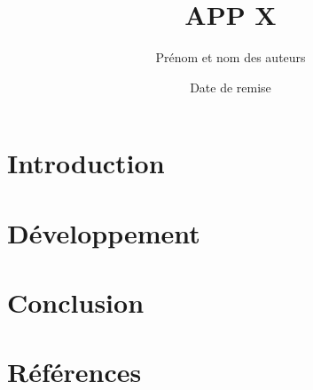 \documentclass[canadien, 12pt]{article}
\title{APP X}
\author{Prénom et nom des auteurs}
\date{Date de remise}
\begin{document}



\newpage


\tableofcontents
\newpage

\listoffigures
\listoftables
\newpage


\section{Introduction}


\section{Développement}


\section{Conclusion}


\section{Références}
{}

\end{document}
